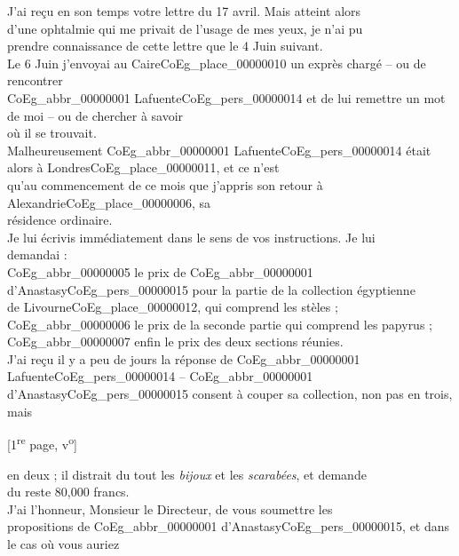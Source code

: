 \documentclass{book}
\begin{document}
J’ai reçu en son temps votre lettre du 17 avril. Mais atteint alors\\
d’une ophtalmie qui me privait de l’usage de mes yeux, je n’ai pu\\
prendre connaissance de cette lettre que le 4 Juin suivant.\\
\indent Le 6 Juin j’envoyai au Caire\gls{CoEg_place_00000010} un exprès chargé – ou de rencontrer\\
\gls{CoEg_abbr_00000001} Lafuente\gls{CoEg_pers_00000014} et de lui remettre un mot de moi – ou de chercher à savoir\\
où il se trouvait.\\
\indent Malheureusement \gls{CoEg_abbr_00000001} Lafuente\gls{CoEg_pers_00000014} était alors à Londres\gls{CoEg_place_00000011}, et ce n’est\\
qu’au commencement de ce mois que j’appris son retour à Alexandrie\gls{CoEg_place_00000006}, sa\\
résidence ordinaire.\\
\indent Je lui écrivis immédiatement dans le sens de vos instructions. Je lui\\
demandai :\\
\indent \gls{CoEg_abbr_00000005} le prix de \gls{CoEg_abbr_00000001} d’Anastasy\gls{CoEg_pers_00000015} pour la partie de la collection égyptienne\\
de Livourne\gls{CoEg_place_00000012}, qui comprend les stèles ;\\
\indent \gls{CoEg_abbr_00000006} le prix de la seconde partie qui comprend les papyrus ;\\
\indent \gls{CoEg_abbr_00000007} enfin le prix des deux sections réunies.\\
\indent J’ai reçu il y a peu de jours la réponse de \gls{CoEg_abbr_00000001} Lafuente\gls{CoEg_pers_00000014} – \gls{CoEg_abbr_00000001}\\
d’Anastasy\gls{CoEg_pers_00000015} consent à couper sa collection, non pas en trois, mais
{\footnotesize \begin{center} [1\textsuperscript{re} page, v\textsuperscript{o}]\end{center}}
\noindent en deux ; il distrait du tout les \textit{bijoux} et les \textit{scarabées}, et demande\\
du reste 80,000 francs.\\
\indent J’ai l’honneur, Monsieur le Directeur, de vous soumettre les\\
propositions de \gls{CoEg_abbr_00000001} d’Anastasy\gls{CoEg_pers_00000015}, et dans le cas où vous auriez\\
\end{document}
